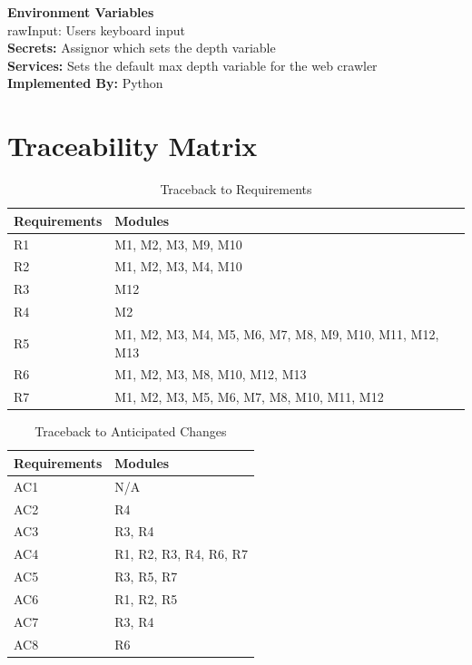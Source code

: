 \documentclass[titlepage]{article}
\begin{document}
\textbf{Environment Variables}\\
rawInput: Users keyboard input\\

\textbf{Secrets:}
Assignor which sets the depth variable\\

\textbf{Services:}
Sets the default max depth variable for the web crawler\\

\textbf{Implemented By:}
Python

\section{Traceability Matrix}
\begin{table}[h!]
\centering
    \begin{tabular}{| p{5cm} | p{5cm} |}    \hline
    Requirements &Modules\\ \hline
    
      R1  &M1, M2, M3, M9, M10 \\ \hline
      R2  &M1, M2, M3, M4, M10 \\ \hline
      R3  &M12 \\ \hline
      R4  &M2 \\ \hline
      R5  &M1, M2, M3, M4, M5, M6, M7, M8, M9, M10, M11, M12, M13 \\ \hline
      R6  &M1, M2, M3, M8, M10, M12, M13 \\ \hline
      R7  &M1, M2, M3, M5, M6, M7, M8, M10, M11, M12 \\ \hline
      
    \end{tabular}
    \caption{Traceback to Requirements}
\label{table:Traceback to Requirements}
\end{table}

\begin{table}[h!]
\centering
    \begin{tabular}{| p{5cm} | p{5cm} |}    \hline
    Requirements &Modules\\ \hline
    
      AC1  & N/A\\ \hline
      AC2  & R4\\ \hline
      AC3  & R3, R4\\ \hline
      AC4  & R1, R2, R3, R4, R6, R7\\ \hline
      AC5  & R3, R5, R7\\ \hline
      AC6  & R1, R2, R5\\ \hline
      AC7  & R3, R4\\ \hline
      AC8  & R6\\ \hline
      
    \end{tabular}
    \caption{Traceback to Anticipated Changes}
\label{table:Traceback to Anticipated Changes}
\end{table}
\pagebreak
\end{document}

